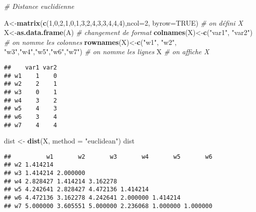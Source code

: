 \documentclass[
]{article}
\newenvironment{Shaded}{\begin{snugshade}}{\end{snugshade}}
\newcommand{\CommentTok}[1]{\textcolor[rgb]{0.56,0.35,0.01}{\textit{#1}}}
\newcommand{\DataTypeTok}[1]{\textcolor[rgb]{0.13,0.29,0.53}{#1}}
\newcommand{\DecValTok}[1]{\textcolor[rgb]{0.00,0.00,0.81}{#1}}
\newcommand{\KeywordTok}[1]{\textcolor[rgb]{0.13,0.29,0.53}{\textbf{#1}}}
\newcommand{\NormalTok}[1]{#1}
\newcommand{\OtherTok}[1]{\textcolor[rgb]{0.56,0.35,0.01}{#1}}
\newcommand{\StringTok}[1]{\textcolor[rgb]{0.31,0.60,0.02}{#1}}
\begin{document}
\begin{Shaded}
\begin{Highlighting}[]
\CommentTok{# Distance euclidienne}

\NormalTok{A<-}\KeywordTok{matrix}\NormalTok{(}\KeywordTok{c}\NormalTok{(}\DecValTok{1}\NormalTok{,}\DecValTok{0}\NormalTok{,}\DecValTok{2}\NormalTok{,}\DecValTok{1}\NormalTok{,}\DecValTok{0}\NormalTok{,}\DecValTok{1}\NormalTok{,}\DecValTok{3}\NormalTok{,}\DecValTok{2}\NormalTok{,}\DecValTok{4}\NormalTok{,}\DecValTok{3}\NormalTok{,}\DecValTok{3}\NormalTok{,}\DecValTok{4}\NormalTok{,}\DecValTok{4}\NormalTok{,}\DecValTok{4}\NormalTok{),}\DataTypeTok{ncol=}\DecValTok{2}\NormalTok{, }\DataTypeTok{byrow=}\OtherTok{TRUE}\NormalTok{) }\CommentTok{# on défini X}
\NormalTok{X<-}\KeywordTok{as.data.frame}\NormalTok{(A) }\CommentTok{# changement de format}
\KeywordTok{colnames}\NormalTok{(X)<-}\KeywordTok{c}\NormalTok{(}\StringTok{"var1"}\NormalTok{, }\StringTok{"var2"}\NormalTok{) }\CommentTok{# on nomme les colonnes}
\KeywordTok{rownames}\NormalTok{(X)<-}\KeywordTok{c}\NormalTok{(}\StringTok{"w1"}\NormalTok{, }\StringTok{"w2"}\NormalTok{, }\StringTok{"w3"}\NormalTok{,}\StringTok{"w4"}\NormalTok{,}\StringTok{"w5"}\NormalTok{,}\StringTok{"w6"}\NormalTok{,}\StringTok{"w7"}\NormalTok{) }\CommentTok{# on nomme les lignes}
\NormalTok{X }\CommentTok{# on affiche X}
\end{Highlighting}
\end{Shaded}

\begin{verbatim}
##    var1 var2
## w1    1    0
## w2    2    1
## w3    0    1
## w4    3    2
## w5    4    3
## w6    3    4
## w7    4    4
\end{verbatim}

\begin{Shaded}
\begin{Highlighting}[]
\NormalTok{dist <-}\StringTok{ }\KeywordTok{dist}\NormalTok{(X, }\DataTypeTok{method =} \StringTok{"euclidean"}\NormalTok{)}
\NormalTok{dist}
\end{Highlighting}
\end{Shaded}

\begin{verbatim}
##          w1       w2       w3       w4       w5       w6
## w2 1.414214                                             
## w3 1.414214 2.000000                                    
## w4 2.828427 1.414214 3.162278                           
## w5 4.242641 2.828427 4.472136 1.414214                  
## w6 4.472136 3.162278 4.242641 2.000000 1.414214         
## w7 5.000000 3.605551 5.000000 2.236068 1.000000 1.000000
\end{verbatim}
\end{document}
